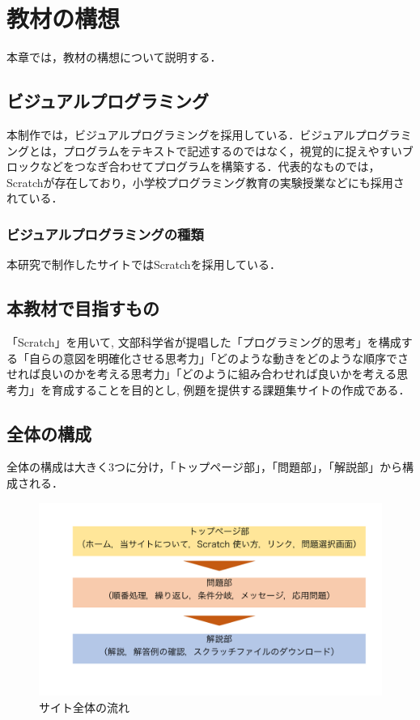 
\newpage

\section{\rm 教材の構想}
本章では，教材の構想について説明する．

\subsection{ビジュアルプログラミング}
本制作では，ビジュアルプログラミングを採用している．ビジュアルプログラミングとは，プログラムをテキストで記述するのではなく，視覚的に捉えやすいブロックなどをつなぎ合わせてプログラムを構築する．代表的なものでは，Scratchが存在しており，小学校プログラミング教育の実験授業などにも採用されている．

\subsubsection{ビジュアルプログラミングの種類}
本研究で制作したサイトではScratchを採用している．

\subsection{本教材で目指すもの}
「Scratch」を用いて, 文部科学省が提唱した「プログラミング的思考」を構成する「自らの意図を明確化させる思考力」「どのような動きをどのような順序でさせれば良いのかを考える思考力」「どのように組み合わせれば良いかを考える思考力」を育成することを目的とし, 例題を提供する課題集サイトの作成である．

\subsection{全体の構成}
全体の構成は大きく3つに分け，「トップページ部」，「問題部」，「解説部」から構成される．

\begin{figure}[h]
\begin{center}
\includegraphics[width=15cm]{nagare.pdf}
\caption{サイト全体の流れ}
\label{fig:houhou}
\end{center}
\end{figure}
\newpage

